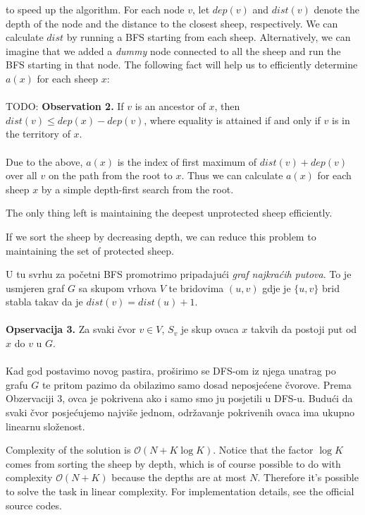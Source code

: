 to speed up the algorithm. For each node $v$, let $dep(v)$ and $dist(v)$
denote the depth of the node and the distance to the closest sheep, 
respectively. We can calculate $dist$ by running a BFS starting from each sheep.
Alternatively, we can
imagine that we added a \textit{dummy} node connected to all the sheep and run
the BFS starting in that node. The following fact will help us to
efficiently determine $a(x)$ for each sheep $x$: \\\\
TODO:
\textbf{Observation 2.} If $v$ is an ancestor of $x$, then $dist(v) \leq
dep(x) - dep(v)$, where equality is attained if and only if $v$ is in the
territory of $x$.
\\\\
Due to the above, $a(x)$ is the index of first maximum of  
$dist(v) + dep(v)$ over all $v$ on the path from the root to $x$. 
Thus we can calculate $a(x)$ for each sheep $x$ 
by a simple depth-first search from the root.

The only thing left is maintaining the deepest unprotected sheep efficiently.

If we sort the sheep by decreasing depth, 
we can reduce this problem to maintaining the set of protected sheep.

U tu svrhu za početni BFS promotrimo pripadajući \textit{graf
najkraćih putova}. To je usmjeren graf $G$ sa skupom vrhova $V$ te bridovima
$(u, v)$ gdje je $\{u, v\}$ brid stabla takav da je $dist(v) = dist(u) + 1$.
\\\\
\textbf{Opservacija 3.} Za svaki čvor $v \in V$, $S_v$ je skup ovaca $x$ takvih
da postoji put od $x$ do $v$ u $G$.
\\\\
Kad god postavimo novog pastira, proširimo se DFS-om iz njega unatrag po grafu
$G$ te pritom pazimo da obilazimo samo dosad neposjećene čvorove. Prema
Obzervaciji 3, ovca je pokrivena ako i samo smo ju posjetili u DFS-u. Budući da
svaki čvor posjećujemo najviše jednom, održavanje pokrivenih ovaca ima ukupno
linearnu složenost.

Complexity of the solution is $\mathcal{O}(N + K\log K)$. Notice that the factor
$\log  K$ comes from sorting the sheep by depth, which is of course possible to
do with complexity $\mathcal{O}(N + K)$ because the depths are at most $N$.
Therefore it's possible to solve the task in linear complexity. For
implementation details, see the official source codes.
